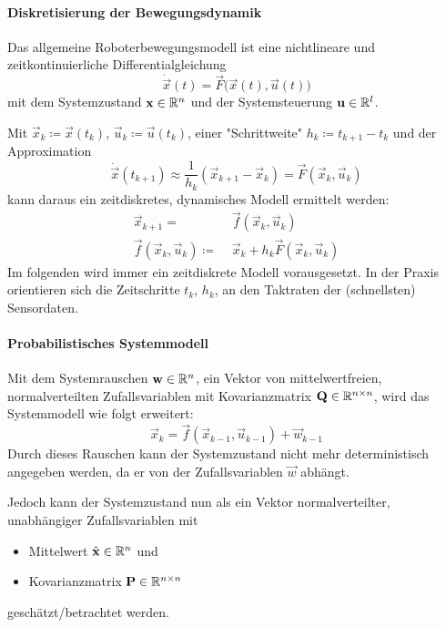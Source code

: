 				\paragraph{Diskretisierung der Bewegungsdynamik}
					Das allgemeine Roboterbewegungsmodell ist eine nichtlineare und zeitkontinuierliche Differentialgleichung
					\begin{equation*}
						\dot{\vec{x}}(t) = \vec{F}\big(\vec{x}(t), \vec{u}(t)\big)
					\end{equation*}
					mit dem Systemzustand \( \boldsymbol{\mathrm{x}} \in \mathbb{R}^n \) und der Systemsteuerung \( \boldsymbol{\mathrm{u}} \in \mathbb{R}^l \).
					
					Mit \( \vec{x}_k \coloneqq \vec{x}(t_k) \), \( \vec{u}_k \coloneqq \vec{u}(t_k) \), einer "Schrittweite" \( h_k \coloneqq t_{k + 1} - t_k \) und der Approximation
					\begin{equation*}
						\dot{\vec{x}}(t_{k + 1}) \approx \frac{1}{h_k} (\vec{x}_{k + 1} - \vec{x}_k) = \vec{F}(\vec{x}_k, \vec{u}_k)
					\end{equation*}
					kann daraus ein zeitdiskretes, dynamisches Modell ermittelt werden:
					\begin{align*}
						\vec{x}_{k + 1} =                       & \,\, \vec{f}(\vec{x}_k, \vec{u}_k)                 \\
						\vec{f}(\vec{x}_k, \vec{u}_k) \coloneqq & \,\, \vec{x}_k + h_k \vec{F}(\vec{x}_k, \vec{u}_k)
					\end{align*}
					Im folgenden wird immer ein zeitdiskrete Modell vorausgesetzt. In der Praxis orientieren sich die Zeitschritte \( t_k \), \bzw \( h_k \), an den Taktraten der (schnellsten) Sensordaten.
				
				\paragraph{Probabilistisches Systemmodell}
					Mit dem Systemrauschen \( \boldsymbol{\mathrm{w}} \in \mathbb{R}^n \), ein Vektor von mittelwertfreien, normalverteilten Zufallsvariablen mit Kovarianzmatrix \( \boldsymbol{\mathrm{Q}} \in \mathbb{R}^{n \times n} \), wird das Systemmodell wie folgt erweitert:
					\begin{equation*}
						\vec{x}_k = \vec{f}(\vec{x}_{k - 1}, \vec{u}_{k - 1}) + \vec{w}_{k - 1}
					\end{equation*}
					Durch dieses Rauschen kann der Systemzustand nicht mehr deterministisch angegeben werden, da er von der Zufallsvariablen \( \vec{w} \) abhängt.
					
					Jedoch kann der Systemzustand nun als ein Vektor normalverteilter, unabhängiger Zufallsvariablen mit
					\begin{itemize}
						\item Mittelwert \( \hat{\boldsymbol{\mathrm{x}}} \in \mathbb{R}^n \) und
						\item Kovarianzmatrix \( \boldsymbol{\mathrm{P}} \in \mathbb{R}^{n \times n} \)
					\end{itemize}
					geschätzt/betrachtet werden.
				
